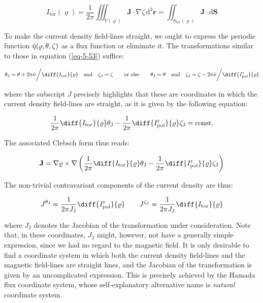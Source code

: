 \begin{equation}
    I_\text{tor}(\varrho)=\frac{1}{2\pi}\iiint_{V(\varrho)}\mathbf{J}\cdot\nabla\zeta\,\mathrm{d}^3\mathbf{r}=\iint_{S_\text{tor}(\varrho)}\mathbf{J}\cdot\mathrm{d}\mathbf{S}
\end{equation}

To make the current density field-lines straight, we ought to express the periodic function $\Tilde{\eta}(\varrho,\theta,\zeta)$ as a flux function or eliminate it. The transformations similar to those in equation (\ref{eq-5-53}) suffice:

\begin{equation}
    \theta_\text{J}=\theta+2\pi\Tilde{\nu}\bigg/\diff{I_\text{tor}}{\varrho}\quad\text{and}\quad\zeta_\text{J}=\zeta\quad\quad\text{or else}\quad\quad\theta_\text{J}=\theta\quad\text{and}\quad\zeta_\text{J}=\zeta-2\pi\Tilde{\nu}\bigg/\diff{I_\text{pol}^\text{r}}{\varrho}
\end{equation}

where the subscript $J$ precisely highlights that these are coordinates in which the current density field-lines are straight, as it is given by the following equation:

\begin{equation}
    \frac{1}{2\pi}\diff{I_\text{tor}}{\varrho}\theta_\text{J}-\frac{1}{2\pi}\diff{I_\text{pol}^\text{r}}{\varrho}\zeta_\text{J}=\text{const.}
\end{equation}

The associated Clebsch form thus reads:

\begin{equation}
    \mathbf{J}=\nabla\varrho\times\nabla\left(\frac{1}{2\pi}\diff{I_\text{tor}}{\varrho}\theta_\text{J}-\frac{1}{2\pi}\diff{I_\text{pol}^\text{r}}{\varrho}\zeta_\text{J}\right)
\end{equation}

The non-trivial contravariant components of the current density are thus:

\begin{equation}
    \label{eq-5-126}
    J^{\theta_\text{J}}=\frac{1}{2\pi J_\text{J}}\diff{I_\text{pol}^\text{r}}{\varrho}\qquad J^{\zeta_\text{J}}=\frac{1}{2\pi J_\text{J}}\diff{I_\text{tor}}{\varrho}
\end{equation}

where $J_\text{J}$ denotes the Jacobian of the transformation under consideration. Note that, in these coordinates, $J_\text{J}$ might, however, not have a generally simple expression, since we had no regard to the magnetic field. It is only desirable to find a coordinate system in which both the current density field-lines and the magnetic field-lines are straight lines, and the Jacobian of the transformation is given by an uncomplicated expression. This is precisely achieved by the Hamada flux coordinate system, whose self-explanatory alternative name is \textit{natural} coordinate system.


